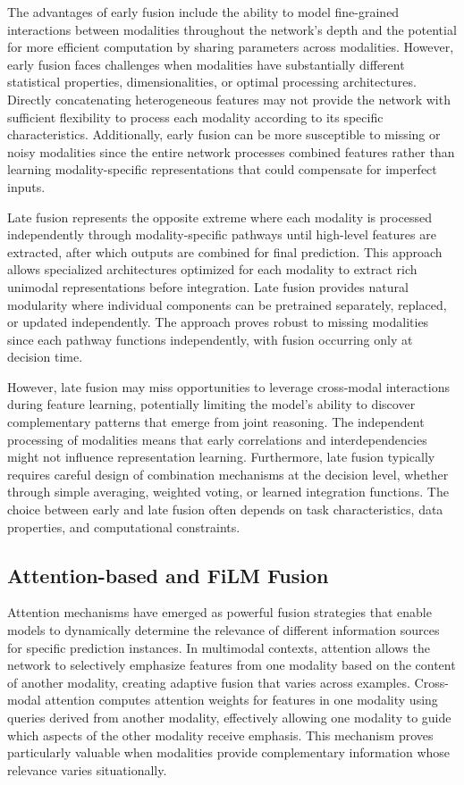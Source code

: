\documentclass[12pt,a4paper]{report}
\begin{document}
The advantages of early fusion include the ability to model fine-grained interactions between modalities throughout the network's depth and the potential for more efficient computation by sharing parameters across modalities. However, early fusion faces challenges when modalities have substantially different statistical properties, dimensionalities, or optimal processing architectures. Directly concatenating heterogeneous features may not provide the network with sufficient flexibility to process each modality according to its specific characteristics. Additionally, early fusion can be more susceptible to missing or noisy modalities since the entire network processes combined features rather than learning modality-specific representations that could compensate for imperfect inputs.

Late fusion represents the opposite extreme where each modality is processed independently through modality-specific pathways until high-level features are extracted, after which outputs are combined for final prediction. This approach allows specialized architectures optimized for each modality to extract rich unimodal representations before integration. Late fusion provides natural modularity where individual components can be pretrained separately, replaced, or updated independently. The approach proves robust to missing modalities since each pathway functions independently, with fusion occurring only at decision time.

However, late fusion may miss opportunities to leverage cross-modal interactions during feature learning, potentially limiting the model's ability to discover complementary patterns that emerge from joint reasoning. The independent processing of modalities means that early correlations and interdependencies might not influence representation learning. Furthermore, late fusion typically requires careful design of combination mechanisms at the decision level, whether through simple averaging, weighted voting, or learned integration functions. The choice between early and late fusion often depends on task characteristics, data properties, and computational constraints.

\subsection{Attention-based and FiLM Fusion}

Attention mechanisms have emerged as powerful fusion strategies that enable models to dynamically determine the relevance of different information sources for specific prediction instances. In multimodal contexts, attention allows the network to selectively emphasize features from one modality based on the content of another modality, creating adaptive fusion that varies across examples. Cross-modal attention computes attention weights for features in one modality using queries derived from another modality, effectively allowing one modality to guide which aspects of the other modality receive emphasis. This mechanism proves particularly valuable when modalities provide complementary information whose relevance varies situationally.
\end{document}
